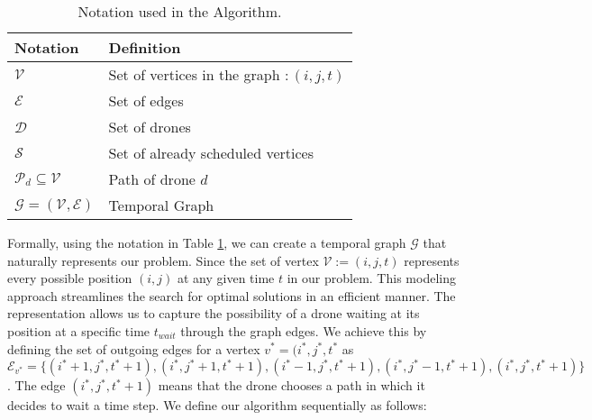 \begin{table}[H]
  \centering
  \caption{Notation used in the Algorithm.}
  \label{tab:notation}
  \begin{tabular}{ll}
    \toprule
    Notation & Definition \\
    \midrule
    $\mathcal{V}$ &Set of vertices in the graph $: (i,j,t)$ \\
    $\mathcal{E}$ & Set of edges  \\
    $\mathcal{D}$ & Set of drones \\
    $\mathcal{S}$ & Set of already scheduled vertices \\
    $\mathcal{P}_d \subseteq \mathcal{V} $ & Path of drone $d$ \\
    $\mathcal{G} = (\mathcal{V},\mathcal{E}) $ & Temporal Graph \\
    \bottomrule
  \end{tabular}
\end{table}

Formally, using the notation in Table \ref{tab:notation}, we can create a temporal graph $\mathcal{G}$ that naturally represents our problem. Since the set of vertex $\mathcal{V}:= (i,j,t)$ represents every possible position $(i,j)$ at any given time $t$ in our problem.  This modeling approach streamlines the search for optimal solutions in an efficient manner. The representation allows us to capture the possibility of a drone waiting at its position at a specific time $t_{wait}$ through the graph edges. We achieve this by defining the set of outgoing edges for a vertex $v^*=(i^*,j^*,t^*$ as $\mathcal{E}_{v^*} = \{ (i^*+1,j^*,t^*+1), (i^*,j^*+1,t^*+1), (i^*-1,j^*,t^*+1), (i^*,j^* -1,t^*+1), (i^*,j^*,t^*+1) \}$. The edge $(i^*,j^*,t^*+1)$ means that the drone chooses a path in which it decides to wait a time step. We define our algorithm sequentially as follows:

